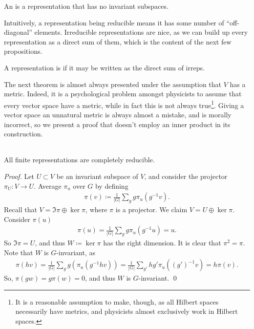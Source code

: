 \documentclass[11pt]{article}
\begin{document}
\begin{definition}
    An  is a representation
    that has no invariant subspaces.
\end{definition}

Intuitively, a representation being reducible means it has
some number of ``off-diagonal'' elements. Irreducible representations
are nice, as we can build up every representation as a direct sum
of them, which is the content of the next few propositions.

\begin{definition}
    A representation is  if
    it may be written as the direct sum of irreps.
\end{definition}

\begin{reemark}
    [Unitarity]
    The next theorem is almost always presented under the assumption
    that $V$ has a metric. Indeed, it is a psychological problem amongst physicists 
    to assume that every vector space have a metric, while in fact this is not 
    always true\footnote{It is a reasonable assumption to make, though, as all 
    Hilbert spaces necessarily have metrics, and physicists almost exclusively 
    work in Hilbert spaces.}. Giving a vector space an unnatural
    metric is always almost a mistake, and is morally incorrect,
    so we present a proof that doesn't employ an inner product
    in its construction.
\end{reemark}

\begin{theorem}{}\\
    All finite representations are completely reducible.
\end{theorem}

\begin{proof}
    Let $U \subset V$ be an invariant subspace of $V$, and
    consider the projector $\pi_U \colon V \to U$.
    Average $\pi_u$ over $G$ by defining
    \begin{align*}
        \pi(v) \coloneqq \frac{1}{|G|} \sum_g g \pi_u(g^{-1} v).
    \end{align*}
    Recall that $V = \Im{\pi} \oplus \ker{\pi}$, where $\pi$ is a
    projector. We claim $V = U \oplus \ker{\pi}$. Consider $\pi(u)$
    \begin{align*}
        \pi(u) = \frac{1}{|G|} \sum_g g \pi_u(g^{-1}u) = u.
    \end{align*}
    So $\Im{\pi} = U$, and thus $W \coloneqq \ker{\pi}$ has
    the right dimension. It is clear that $\pi^2 = \pi$. Note 
    that $W$ is $G$-invariant, as
    \begin{align*}
        \pi(hv) = \frac{1}{|G|} \sum_g g(\pi_u(g^{-1}hv)) = \frac{1}{|G|} \sum_{g'} hg' \pi_u((g')^{-1}v) = h \pi(v).
    \end{align*}
    So, $\pi(gw) = g\pi(w) = 0$, and thus $W$ is $G$-invariant.
    \qed
\end{proof}
\end{document}
